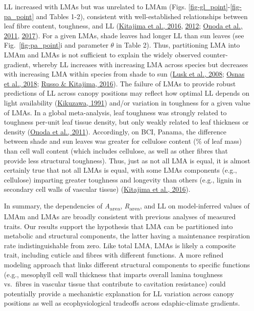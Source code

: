 \documentclass[
  12pt,
  letterpaper,
  DIV=11,
  numbers=noendperiod]{scrartcl}
\begin{document}
LL increased with LMAs but was unrelated to LMAm (Figs.
\ref{fig-gl_point}-\ref{fig-pa_point} and Tables 1-2), consistent with
well-established relationships between leaf fibre content, toughness,
and LL (\protect\hyperlink{ref-Kitajima2016}{Kitajima et al., 2016},
\protect\hyperlink{ref-Kitajima2012}{2012};
\protect\hyperlink{ref-Onoda2011}{Onoda et al., 2011},
\protect\hyperlink{ref-Onoda2017}{2017}). For a given LMAs, shade leaves
had longer LL than sun leaves (see Fig.~\ref{fig-pa_point}i and
parameter \(\theta\) in Table 2). Thus, partitioning LMA into LMAm and
LMAs is not sufficient to explain the widely observed counter-gradient,
whereby LL increases with increasing LMA across species but decreases
with increasing LMA within species from shade to sun
(\protect\hyperlink{ref-Lusk2008}{Lusk et al., 2008};
\protect\hyperlink{ref-Osnas2018}{Osnas et al., 2018};
\protect\hyperlink{ref-Russo2016}{Russo \& Kitajima, 2016}). The failure
of LMAs to provide robust predictions of LL across canopy positions may
reflect how optimal LL depends on light availability
(\protect\hyperlink{ref-Kikuzawa1991}{Kikuzawa, 1991}) and/or variation
in toughness for a given value of LMAs. In a global meta-analysis, leaf
toughness was strongly related to toughness per-unit leaf tissue
density, but only weakly related to leaf thickness or density
(\protect\hyperlink{ref-Onoda2011}{Onoda et al., 2011}). Accordingly, on
BCI, Panama, the difference between shade and sun leaves was greater for
cellulose content (\% of leaf mass) than cell wall content (which
includes cellulose, as well as other fibres that provide less structural
toughness). Thus, just as not all LMA is equal, it is almost certainly
true that not all LMAs is equal, with some LMAs components (e.g.,
cellulose) imparting greater toughness and longevity than others (e.g.,
lignin in secondary cell walls of vascular tissue)
(\protect\hyperlink{ref-Kitajima2016}{Kitajima et al., 2016}).

In summary, the dependencies of \emph{A}\textsubscript{area},
\emph{R}\textsubscript{area}, and LL on model-inferred values of LMAm
and LMAs are broadly consistent with previous analyses of measured
traits. Our results support the hypothesis that LMA can be partitioned
into metabolic and structural components, the latter having a
maintenance respiration rate indistinguishable from zero. Like total
LMA, LMAs is likely a composite trait, including cuticle and fibres with
different functions. A more refined modeling approach that links
different structural components to specific functions (e.g., mesophyll
cell wall thickness that imparts overall lamina toughness vs.~fibres in
vascular tissue that contribute to cavitation resistance) could
potentially provide a mechanistic explanation for LL variation across
canopy positions as well as ecophysiological tradeoffs across
edaphic-climate gradients.
\end{document}
